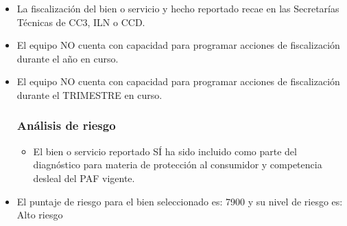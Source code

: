 \documentclass[
  11pt,
  a4paper,
  oneside]{article}
\providecommand{\tightlist}{%
  \setlength{\itemsep}{0pt}\setlength{\parskip}{0pt}}
\begin{document}
\begin{itemize}
\tightlist
\item
  La fiscalización del bien o servicio y hecho reportado recae en las
  Secretarías Técnicas de CC3, ILN o CCD.
\item
  El equipo NO cuenta con capacidad para programar acciones de
  fiscalización durante el año en curso.
\item
  El equipo NO cuenta con capacidad para programar acciones de
  fiscalización durante el TRIMESTRE en curso.

  \subsubsection{Análisis de riesgo}

  \begin{itemize}
  \tightlist
  \item
    El bien o servicio reportado SÍ ha sido incluido como parte del
    diagnóstico para materia de protección al consumidor y competencia
    desleal del PAF vigente.
  \end{itemize}
\item
  El puntaje de riesgo para el bien seleccionado es: 7900 y su nivel de
  riesgo es: Alto riesgo \setlength{\arrayrulewidth}{0.35mm}


\end{itemize}
\end{document}
